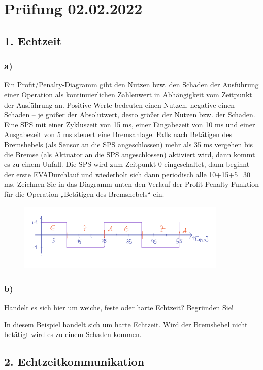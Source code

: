\section{Prüfung 02.02.2022}

\subsection{1. Echtzeit}
\subsubsection{a)}
Ein Profit/Penalty-Diagramm gibt den Nutzen bzw. den Schaden der Ausführung einer Operation als
kontinuierlichen Zahlenwert in Abhängigkeit vom Zeitpunkt der Ausführung an. Positive Werte
bedeuten einen Nutzen, negative einen Schaden – je größer der Absolutwert, desto größer der Nutzen
bzw. der Schaden.
Eine SPS mit einer Zykluszeit von 15 ms, einer Eingabezeit von 10 ms und einer Ausgabezeit von 5 ms
steuert eine Bremsanlage. Falls nach Betätigen des Bremshebels (als Sensor an die SPS angeschlossen)
mehr als 35 ms vergehen bis die Bremse (als Aktuator an die SPS angeschlossen) aktiviert wird, dann
kommt es zu einem Unfall. Die SPS wird zum Zeitpunkt 0 eingeschaltet, dann beginnt der erste EVADurchlauf und wiederholt sich dann periodisch alle 10+15+5=30 ms.
Zeichnen Sie in das Diagramm unten den Verlauf der Profit-Penalty-Funktion für die Operation
„Betätigen des Bremshebels“ ein.

\begin{figure}[H]
  \includegraphics[width=10cm]{images/KA020222/1a.PNG}
  \centering
\end{figure}

\subsubsection{b)}
Handelt es sich hier um weiche, feste oder harte Echtzeit? Begründen Sie!

In diesem Beispiel handelt sich um harte Echtzeit. Wird der Bremshebel nicht betätigt wird es zu einem Schaden kommen.

\subsection{2. Echtzeitkommunikation}
